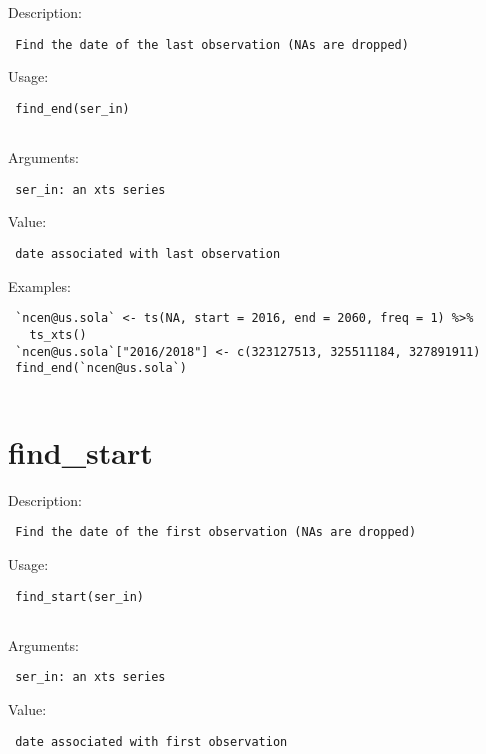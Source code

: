 \documentclass[
  letterpaper,
  DIV=11,
  numbers=noendperiod]{scrreport}
\begin{document}
Description:

\begin{verbatim}
 Find the date of the last observation (NAs are dropped)
\end{verbatim}

Usage:

\begin{verbatim}
 find_end(ser_in)
 
\end{verbatim}

Arguments:

\begin{verbatim}
 ser_in: an xts series
\end{verbatim}

Value:

\begin{verbatim}
 date associated with last observation
\end{verbatim}

Examples:

\begin{verbatim}
 `ncen@us.sola` <- ts(NA, start = 2016, end = 2060, freq = 1) %>% 
   ts_xts()
 `ncen@us.sola`["2016/2018"] <- c(323127513, 325511184, 327891911)
 find_end(`ncen@us.sola`)
 
\end{verbatim}

\section{find\_start}\label{find_start}

Description:

\begin{verbatim}
 Find the date of the first observation (NAs are dropped)
\end{verbatim}

Usage:

\begin{verbatim}
 find_start(ser_in)
 
\end{verbatim}

Arguments:

\begin{verbatim}
 ser_in: an xts series
\end{verbatim}

Value:

\begin{verbatim}
 date associated with first observation
\end{verbatim}
\end{document}
